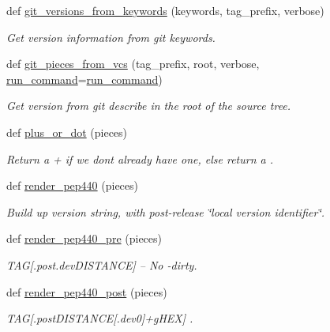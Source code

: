 \begin{DoxyCompactItemize}
def \hyperlink{namespacesrc_1_1__version_af7c030b0c688642e46d34ee86979d5b1}{git\+\_\+versions\+\_\+from\+\_\+keywords} (keywords, tag\+\_\+prefix, verbose)
\begin{DoxyCompactList}\small\item\em Get version information from git keywords. \end{DoxyCompactList}\item 
def \hyperlink{namespacesrc_1_1__version_a7f961ca0bf593256fdbc850f707dadca}{git\+\_\+pieces\+\_\+from\+\_\+vcs} (tag\+\_\+prefix, root, verbose, \hyperlink{namespacesrc_1_1__version_a07869f13dacbb2c9659c38961e969824}{run\+\_\+command}=\hyperlink{namespacesrc_1_1__version_a07869f13dacbb2c9659c38961e969824}{run\+\_\+command})
\begin{DoxyCompactList}\small\item\em Get version from \textquotesingle{}git describe\textquotesingle{} in the root of the source tree. \end{DoxyCompactList}\item 
def \hyperlink{namespacesrc_1_1__version_a21c3be02b22ff9893ddf1de4b4609066}{plus\+\_\+or\+\_\+dot} (pieces)
\begin{DoxyCompactList}\small\item\em Return a + if we don\textquotesingle{}t already have one, else return a . \end{DoxyCompactList}\item 
def \hyperlink{namespacesrc_1_1__version_a08b184a852fca45124c31efad07ae91d}{render\+\_\+pep440} (pieces)
\begin{DoxyCompactList}\small\item\em Build up version string, with post-\/release \char`\"{}local version identifier\char`\"{}. \end{DoxyCompactList}\item 
def \hyperlink{namespacesrc_1_1__version_a966d7d904289700bc6bbc20d64bd5c6e}{render\+\_\+pep440\+\_\+pre} (pieces)
\begin{DoxyCompactList}\small\item\em T\+AG\mbox{[}.post.\+dev\+D\+I\+S\+T\+A\+N\+CE\mbox{]} -- No -\/dirty. \end{DoxyCompactList}\item 
def \hyperlink{namespacesrc_1_1__version_a2553edd494b07cc780e662bbb2467b66}{render\+\_\+pep440\+\_\+post} (pieces)
\begin{DoxyCompactList}\small\item\em T\+AG\mbox{[}.post\+D\+I\+S\+T\+A\+N\+CE\mbox{[}.dev0\mbox{]}+g\+H\+EX\mbox{]} . \end{DoxyCompactList}\item 

\end{DoxyCompactItemize}
